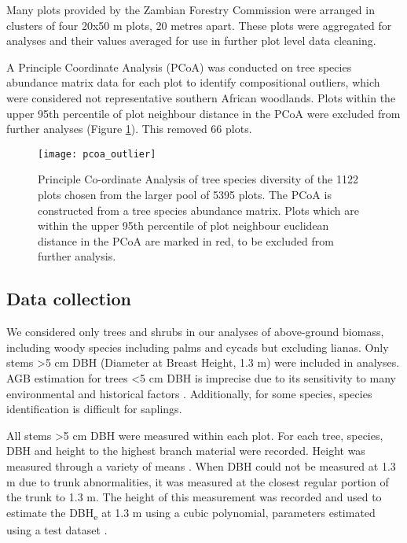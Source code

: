 \documentclass[11pt,a4paper]{article}
\begin{document}
Many plots provided by the Zambian Forestry Commission were arranged in clusters of four 20x50 m plots, 20 metres apart. These plots were aggregated for analyses and their values averaged for use in further plot level data cleaning.

A Principle Coordinate Analysis (PCoA) was conducted on tree species abundance matrix data for each plot to identify compositional outliers, which were considered not representative southern African woodlands. Plots within the upper 95th percentile of plot neighbour distance in the PCoA were excluded from further analyses (Figure \ref{pcoa_outlier}). This removed 66 plots.

\begin{figure}[H]
\centering
	\texttt{[image: pcoa\_outlier]}
	\caption{Principle Co-ordinate Analysis of tree species diversity of the 1122 plots chosen from the larger pool of 5395 plots. The PCoA is constructed from a tree species abundance matrix. Plots which are within the upper 95th percentile of plot neighbour euclidean distance in the PCoA are marked in red, to be excluded from further analysis.}
	\label{pcoa_outlier}
\end{figure}

\subsection{Data collection}

We considered only trees and shrubs in our analyses of above-ground biomass, including woody species including palms and cycads but excluding lianas. Only stems \textgreater{}5 cm DBH (Diameter at Breast Height, 1.3 m) were included in analyses. AGB estimation for trees \textless{}5 cm DBH is imprecise due to its sensitivity to many environmental and historical factors \citep{}. Additionally, for some species, species identification is difficult for saplings.

All stems \textgreater{}5 cm DBH were measured within each plot. For each tree, species, DBH and height to the highest branch material were recorded. Height was measured through a variety of means . When DBH could not be measured at 1.3 m due to trunk abnormalities, it was measured at the closest regular portion of the trunk to 1.3 m. The height of this measurement was recorded and used to estimate the DBH\textsubscript{e} at 1.3 m using a cubic polynomial, parameters estimated using a test dataset \citep{Ryanunbublished}.
\end{document}
